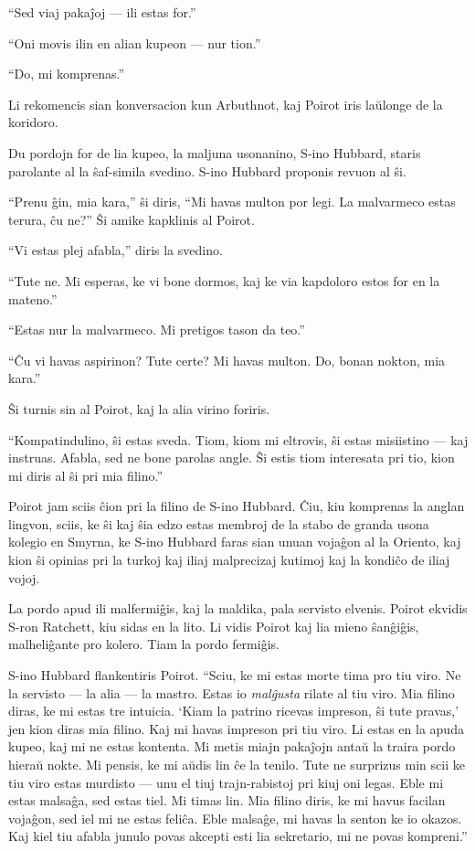 ``Sed viaj pakaĵoj --- ili estas for.''

``Oni movis ilin en alian kupeon --- nur tion.''

``Do, mi komprenas.''

Li rekomencis sian konversacion kun Arbuthnot, kaj Poirot iris laŭlonge de la koridoro.

Du pordojn for de lia kupeo, la maljuna usonanino, S-ino Hubbard, staris parolante al la ŝaf-simila svedino. S-ino Hubbard proponis revuon al ŝi.

``Prenu ĝin, mia kara,'' ŝi diris, ``Mi havas multon por legi. La malvarmeco estas terura, ĉu ne?'' Ŝi amike kapklinis al Poirot.

``Vi estas plej afabla,'' diris la svedino.

``Tute ne. Mi esperas, ke vi bone dormos, kaj ke via kapdoloro estos for en la mateno.''

``Estas nur la malvarmeco. Mi pretigos tason da teo.''

``Ĉu vi havas aspirinon? Tute certe? Mi havas multon. Do, bonan nokton, mia kara.''

Ŝi turnis sin al Poirot, kaj la alia virino foriris.

``Kompatindulino, ŝi estas sveda. Tiom, kiom mi eltrovis, ŝi estas misiistino --- kaj instruas. Afabla, sed ne bone parolas angle. Ŝi estis tiom interesata pri tio, kion mi diris al ŝi pri mia filino.''

Poirot jam sciis ĉion pri la filino de S-ino Hubbard. Ĉiu, kiu komprenas la anglan lingvon, sciis, ke ŝi kaj ŝia edzo estas membroj de la stabo de granda usona kolegio en Smyrna, ke S-ino Hubbard faras sian unuan vojaĝon al la Oriento, kaj kion ŝi opinias pri la turkoj kaj iliaj malprecizaj kutimoj kaj la kondiĉo de iliaj vojoj.

La pordo apud ili malfermiĝis, kaj la maldika, pala servisto elvenis. Poirot ekvidis S-ron Ratchett, kiu sidas en la lito. Li vidis Poirot kaj lia mieno ŝanĝiĝis, malheliĝante pro kolero. Tiam la pordo fermiĝis.

S-ino Hubbard flankentiris Poirot. ``Sciu, ke mi estas morte tima pro tiu viro. Ne la servisto --- la alia --- la mastro. Estas io \emph{malĝusta} rilate al tiu viro. Mia filino diras, ke mi estas tre intuicia. `Kiam la patrino ricevas impreson, ŝi tute pravas,' jen kion diras mia filino. Kaj mi havas impreson pri tiu viro. Li estas en la apuda kupeo, kaj mi ne estas kontenta. Mi metis miajn pakaĵojn antaŭ la traira pordo hieraŭ nokte. Mi pensis, ke mi aŭdis lin ĉe la tenilo. Tute ne surprizus min scii ke tiu viro estas murdisto --- unu el tiuj trajn-rabistoj pri kiuj oni legas. Eble mi estas malsaĝa, sed estas tiel. Mi timas lin. Mia filino diris, ke mi havus facilan vojaĝon, sed iel mi ne estas feliĉa. Eble malsaĝe, mi havas la senton ke io okazos. Kaj kiel tiu afabla junulo povas akcepti esti lia sekretario, mi ne povas kompreni.''

